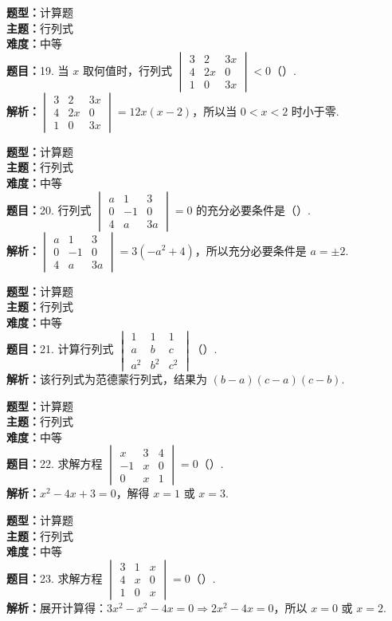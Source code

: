 \documentclass{ctexart}
\newenvironment{question}[5]{%
	\noindent\textbf{题型：}#1\\
	\textbf{主题：}#2\\
	\textbf{难度：}#3\\
	\textbf{题目：}#4\\
	\textbf{解析：}#5\\
	\vspace{1em}
}{}
\begin{document}
	\begin{question} 
		{计算题} 
		{行列式}
		{中等}
		{19. 当 \(x\) 取何值时，行列式 \(\begin{vmatrix} 3 & 2 & 3x \\ 4 & 2x & 0 \\ 1 & 0 & 3x\end{vmatrix}<0\)（）. }
		{\(\begin{vmatrix} 3 & 2 & 3x \\ 4 & 2x & 0 \\ 1 & 0 & 3x\end{vmatrix} = 12x(x - 2)\)，所以当 \(0 < x < 2\) 时小于零. }
	\end{question}
	
	\begin{question} 
		{计算题} 
		{行列式}
		{中等}
		{20. 行列式 \(\begin{vmatrix} a & 1 & 3 \\ 0 & -1 & 0 \\ 4 & a & 3a\end{vmatrix}=0\) 的充分必要条件是（）. }
		{\(\begin{vmatrix} a & 1 & 3 \\ 0 & -1 & 0 \\ 4 & a & 3a\end{vmatrix} = 3(-a^2 + 4)\)，所以充分必要条件是 \(a = \pm2\). }
	\end{question}
	
	\begin{question} 
		{计算题} 
		{行列式}
		{中等}
		{21. 计算行列式 \(\begin{vmatrix} 1 & 1 & 1 \\ a & b & c \\ a^2 & b^2 & c^2\end{vmatrix}\)（）. }
		{该行列式为范德蒙行列式，结果为 \((b - a)(c - a)(c - b)\). }
	\end{question}
	
	\begin{question} 
		{计算题} 
		{行列式}
		{中等}
		{22. 求解方程 \(\begin{vmatrix} x & 3 & 4 \\ -1 & x & 0 \\ 0 & x & 1\end{vmatrix} = 0\)（）. }
		{\(x^2 - 4x + 3 = 0\)，解得 \(x = 1\) 或 \(x = 3\). }
	\end{question}
	
	\begin{question} 
		{计算题} 
		{行列式}
		{中等}
		{23. 求解方程 \(\begin{vmatrix} 3 & 1 & x \\ 4 & x & 0 \\ 1 & 0 & x\end{vmatrix}=0\)（）. }
		{展开计算得：\(3x^2 - x^2 - 4x = 0 \Rightarrow 2x^2 - 4x = 0\)，所以 \(x = 0\) 或 \(x = 2\). }
	\end{question}
	
\end{document}

